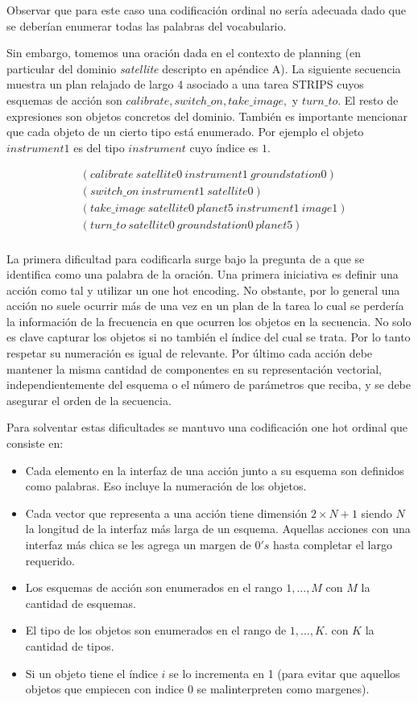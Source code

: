 Observar que para este caso una codificación ordinal no sería adecuada dado que
se deberían enumerar todas las palabras del vocabulario.

Sin embargo, tomemos una oración dada en el contexto de planning (en particular
del dominio \emph{satellite} descripto en apéndice A). La siguiente secuencia
muestra un plan relajado de largo 4 asociado a una tarea STRIPS cuyos esquemas
de acción son $calibrate, switch\_on, take\_image,$ y $turn\_to$. El resto de
expresiones son objetos concretos del dominio. También es importante mencionar
que cada objeto de un cierto tipo está enumerado. Por ejemplo el objeto
$instrument1$ es del tipo $instrument$ cuyo índice es $1$. 

\begin{align*}
    & (calibrate\ satellite0\ instrument1\ groundstation0) \\
    & (switch\_on\ instrument1\ satellite0) \\
    & (take\_image\ satellite0\ planet5\ instrument1\ image1) \\
    & (turn\_to\ satellite0\ groundstation0\ planet5) \\
\end{align*}

La primera dificultad para codificarla surge bajo la pregunta de a que se
identifica como una palabra de la oración. Una primera iniciativa es definir una
acción como tal y utilizar un one hot encoding. No obstante, por lo general
una acción no suele ocurrir más de una vez en un plan de la tarea lo cual se
perdería la información de la frecuencia en que ocurren los objetos en la
secuencia. No solo es clave capturar los objetos si no también el índice del
cual se trata. Por lo tanto respetar su numeración es igual de relevante. Por
último cada acción debe mantener la misma cantidad de componentes en su
representación vectorial, independientemente del esquema o el número de
parámetros que reciba, y se debe asegurar el orden de la secuencia.

Para solventar estas dificultades se mantuvo una codificación one hot ordinal que
consiste en:

\begin{itemize}
    \item Cada elemento en la interfaz de una acción junto a su esquema son
    definidos como palabras. Eso incluye la numeración de los objetos.
    \item Cada vector que representa a una acción tiene dimensión $2 \times N +
    1$ siendo $N$ la longitud de la interfaz más larga de un esquema. Aquellas
    acciones con una interfaz más chica se les agrega un margen de $0's$ hasta
    completar el largo requerido.
    \item Los esquemas de acción son enumerados en el rango $1, ..., M$ con $M$
    la cantidad de esquemas.
    \item El tipo de los objetos son enumerados en el rango de $1, ..., K$. con
    $K$ la cantidad de tipos.
    \item Si un objeto tiene el índice $i$ se lo incrementa en 1 (para evitar que
    aquellos objetos que empiecen con indice 0 se malinterpreten como margenes).
\end{itemize}

